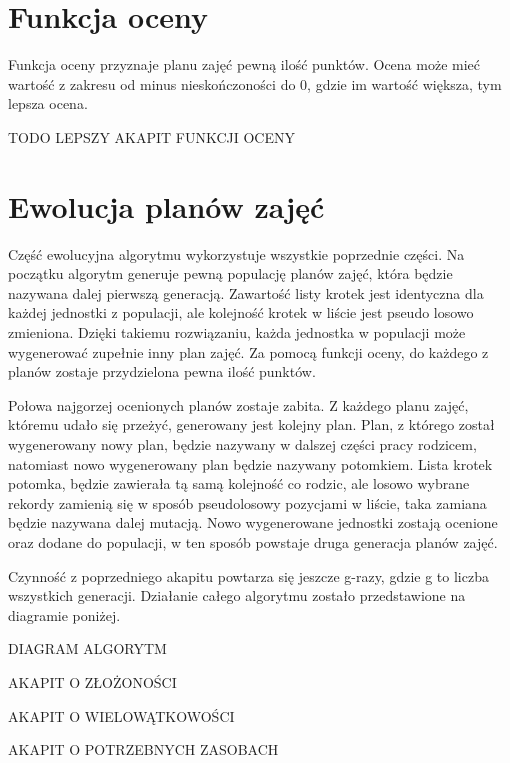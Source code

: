 \section{Funkcja oceny}

    Funkcja oceny przyznaje planu zajęć pewną ilość punktów. Ocena może mieć wartość z zakresu od minus nieskończoności do 0, gdzie im wartość większa, tym lepsza ocena.

TODO LEPSZY AKAPIT FUNKCJI OCENY 

\section{Ewolucja planów zajęć}

    Część ewolucyjna algorytmu wykorzystuje wszystkie poprzednie części. Na początku algorytm generuje pewną populację planów zajęć, która będzie nazywana dalej pierwszą generacją. Zawartość listy krotek jest identyczna dla każdej jednostki z populacji, ale kolejność krotek w liście jest pseudo losowo zmieniona. Dzięki takiemu rozwiązaniu, każda jednostka w populacji może wygenerować zupełnie inny plan zajęć. Za pomocą funkcji oceny, do każdego z planów zostaje przydzielona pewna ilość punktów. 

Połowa najgorzej ocenionych planów zostaje zabita. Z każdego planu zajęć, któremu udało się przeżyć, generowany jest kolejny plan. Plan, z którego został wygenerowany nowy plan, będzie nazywany w dalszej części pracy rodzicem, natomiast nowo wygenerowany plan będzie nazywany potomkiem. Lista krotek potomka, będzie zawierała tą samą kolejność co rodzic, ale losowo wybrane rekordy zamienią się w sposób pseudolosowy pozycjami w liście, taka zamiana będzie nazywana dalej mutacją. Nowo wygenerowane jednostki zostają ocenione oraz dodane do populacji, w ten sposób powstaje druga generacja planów zajęć.

    Czynność z poprzedniego akapitu powtarza się jeszcze g-razy, gdzie g to liczba wszystkich generacji. Działanie całego algorytmu zostało przedstawione na diagramie poniżej.


DIAGRAM ALGORYTM

AKAPIT O ZŁOŻONOŚCI

AKAPIT O WIELOWĄTKOWOŚCI

AKAPIT O POTRZEBNYCH ZASOBACH


